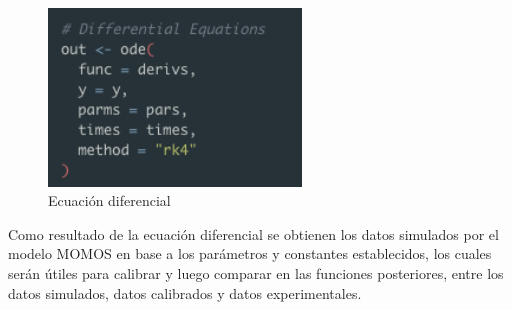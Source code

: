 \begin{figure}[H]
  \centering
    \begin{minipage}{0.6\textwidth}
      \centering
      \includegraphics[width=0.6\textwidth]{figure_4_12.png}
      \caption{Ecuaci\'on diferencial}
      \label{fig:Fig}
    \end{minipage}%
    \hspace{5mm}
\end{figure}

Como resultado de la ecuaci\'on diferencial se obtienen los datos simulados por el modelo MOMOS en base a los par\'ametros y constantes establecidos, los cuales ser\'an \'utiles para calibrar y luego comparar en las funciones posteriores, entre los datos simulados, datos calibrados y datos experimentales.\\

